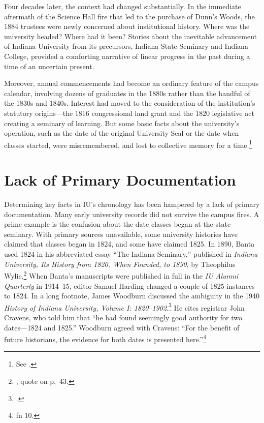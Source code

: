 \documentclass[
  american,
  letterpaper,
]{scrreprt}
\begin{document}
Four decades later, the context had changed substantially. In the
immediate aftermath of the Science Hall fire that led to the purchase of
Dunn's Woods, the 1884 trustees were newly concerned about institutional
history. Where was the university headed? Where had it been? Stories
about the inevitable advancement of Indiana University from its
precursors, Indiana State Seminary and Indiana College, provided a
comforting narrative of linear progress in the past during a time of an
uncertain present.

Moreover, annual commencements had become an ordinary feature of the
campus calendar, involving dozens of graduates in the 1880s rather than
the handful of the 1830s and 1840s. Interest had moved to the
consideration of the institution's statutory origins---the 1816
congressional land grant and the 1820 legislative act creating a
seminary of learning. But some basic facts about the university's
operation, such as the date of the original University Seal or the date
when classes started, were misremembered, and lost to collective memory
for a time.\footnote{See .}

\section{Lack of Primary
Documentation}\label{lack-of-primary-documentation}

Determining key facts in IU's chronology has been hampered by a lack of
primary documentation. Many early university records did not survive the
campus fires. A prime example is the confusion about the date classes
began at the state seminary. With primary sources unavailable, some
university histories have claimed that classes began in 1824, and some
have claimed 1825. In 1890, Banta used 1824 in his abbreviated essay
``The Indiana Seminary,'' published in \emph{Indiana University, Its
History from 1820, When Founded, to 1890}, by Theophilus
Wylie.\footnote{, quote on p.~43.}
When Banta's manuscripts were published in full in the \emph{IU Alumni
Quarterly} in 1914--15, editor Samuel Harding changed a couple of 1825
instances to 1824. In a long footnote, James Woodburn discussed the
ambiguity in the 1940 \emph{History of Indiana University, Volume I:
1820--1902}.\footnote{.} He cites registrar John Cravens,
who told him that ``he had found seemingly good authority for two
dates---1824 and 1825.'' Woodburn agreed with Cravens: ``For the benefit
of future historians, the evidence for both dates is presented
here.''\footnote{ fn 10.}
\end{document}
